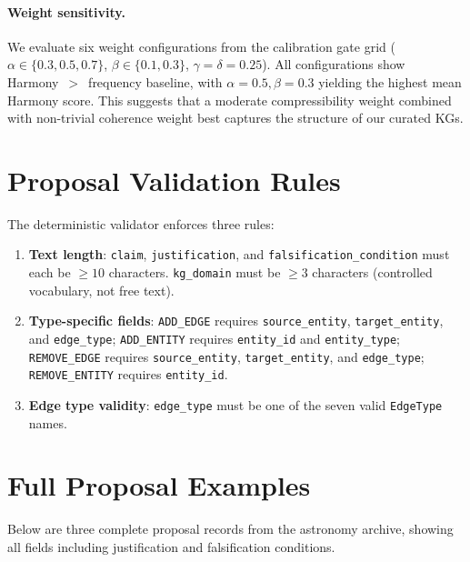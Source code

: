 \paragraph{Weight sensitivity.}
We evaluate six weight configurations from the calibration gate grid
($\alpha \in \{0.3, 0.5, 0.7\}$, $\beta \in \{0.1, 0.3\}$,
$\gamma = \delta = 0.25$).  All configurations show Harmony~$>$~frequency
baseline, with $\alpha = 0.5, \beta = 0.3$ yielding the highest mean Harmony
score.  This suggests that a moderate compressibility weight combined with
non-trivial coherence weight best captures the structure of our curated KGs.

\section{Proposal Validation Rules}\label{app:validation}

The deterministic validator enforces three rules:
\begin{enumerate}[nosep]
  \item \textbf{Text length}: \texttt{claim}, \texttt{justification},
    and \texttt{falsification\_condition} must each be $\geq 10$ characters.
    \texttt{kg\_domain} must be $\geq 3$ characters (controlled vocabulary,
    not free text).
  \item \textbf{Type-specific fields}: \texttt{ADD\_EDGE} requires
    \texttt{source\_entity}, \texttt{target\_entity}, and \texttt{edge\_type};
    \texttt{ADD\_ENTITY} requires \texttt{entity\_id} and \texttt{entity\_type};
    \texttt{REMOVE\_EDGE} requires \texttt{source\_entity},
    \texttt{target\_entity}, and \texttt{edge\_type};
    \texttt{REMOVE\_ENTITY} requires \texttt{entity\_id}.
  \item \textbf{Edge type validity}: \texttt{edge\_type} must be one of the seven
    valid \texttt{EdgeType} names.
\end{enumerate}

\section{Full Proposal Examples}\label{app:proposals}

Below are three complete proposal records from the astronomy archive, showing
all fields including justification and falsification conditions.

